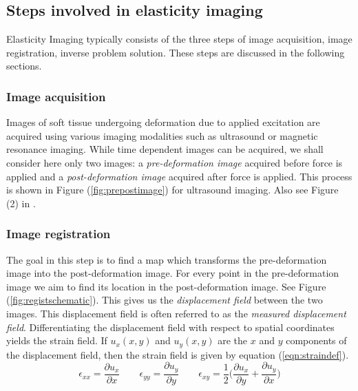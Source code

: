 \documentclass[12pt]{article}
\newcommand{\beq}{\begin{equation}}
\newcommand{\eeq}{\end{equation}}
\newcommand{\pdd}[2]{\frac{\partial{{#1}}}{\partial{#2}}}
\begin{document}
\subsection{Steps involved in elasticity imaging}
Elasticity Imaging typically consists of the three steps of image acquisition, image registration, inverse problem solution. These steps are discussed in the following sections.
\subsubsection{Image acquisition} Images of soft tissue undergoing deformation due to applied excitation are acquired using various imaging modalities such as ultrasound or magnetic resonance imaging. While time dependent images can be acquired, we shall consider here only two images: a \textit{pre-deformation image} acquired before force is applied and a \textit{post-deformation image} acquired after force is applied. This process is shown in Figure (\ref{fig:prepostimage}) for ultrasound imaging. Also see Figure (2) in \cite{paper:konofagou2004}.
\subsubsection{Image registration} The goal in this step is to find a map which transforms the pre-deformation image into the post-deformation image. For every point in the pre-deformation image we aim to find its location in the post-deformation image. See Figure (\ref{fig:registschematic}). This gives us the \textit{displacement field} between the two images. This displacement field is often referred to as the \textit{measured displacement field}. Differentiating the displacement field with respect to spatial coordinates yields the strain field. If $u_x(x,y)$ and $u_{y}(x,y)$ are the $x$ and $y$ components of the displacement field, then the strain field is given by equation (\ref{eqn:straindef}).
\beq
\label{eqn:straindef}
\epsilon_{xx} = \pdd{u_{x}}{x} \qquad \epsilon_{yy} = \pdd{u_{y}}{y} \qquad \epsilon_{xy} = \frac{1}{2}\Big(\pdd{u_{x}}{y} + \pdd{u_{y}}{x}\Big)
\eeq
\end{document}

